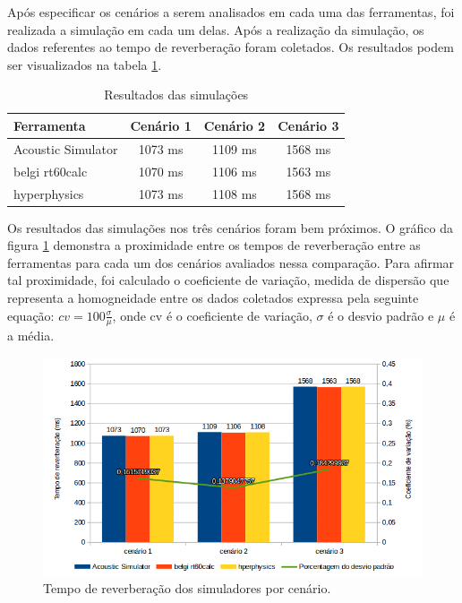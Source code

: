 Após especificar os cenários a serem analisados em cada uma das ferramentas, foi realizada a simulação em cada um delas. Após a realização da simulação, os dados referentes ao tempo de reverberação foram coletados. Os resultados podem ser visualizados na tabela \ref{resultados}.

\begin{table}[]
\centering
\caption{Resultados das simulações}
\label{resultados}
\begin{tabular}{|l|c|c|c|}
\hline
\textbf{Ferramenta} & \textbf{Cenário 1} & \textbf{Cenário 2} & \textbf{Cenário 3} \\ \hline
Acoustic Simulator  & 1073 ms             & 1109 ms             & 1568 ms            \\
belgi rt60calc      & 1070 ms             & 1106 ms             & 1563 ms            \\
hyperphysics        & 1073 ms             & 1108 ms             & 1568 ms            \\ \hline
\end{tabular}
\end{table}

Os resultados das simulações nos três cenários foram bem próximos. O gráfico da figura \ref{comparacao} demonstra a proximidade entre os tempos de reverberação entre as ferramentas para cada um dos cenários avaliados nessa comparação. Para afirmar tal proximidade, foi calculado o coeficiente de variação, medida de dispersão que representa a homogneidade entre os dados coletados expressa pela seguinte equação: $ cv = 100\frac{\sigma}{\mu} $, onde cv é o coeficiente de variação, $\sigma$ é o desvio padrão e $\mu$ é a média.

\begin{figure}[!htb]
\centering
\includegraphics[scale=0.6]{figuras/comparacao}
\caption{Tempo de reverberação dos simuladores por cenário.}
\label{comparacao}
\end{figure}

